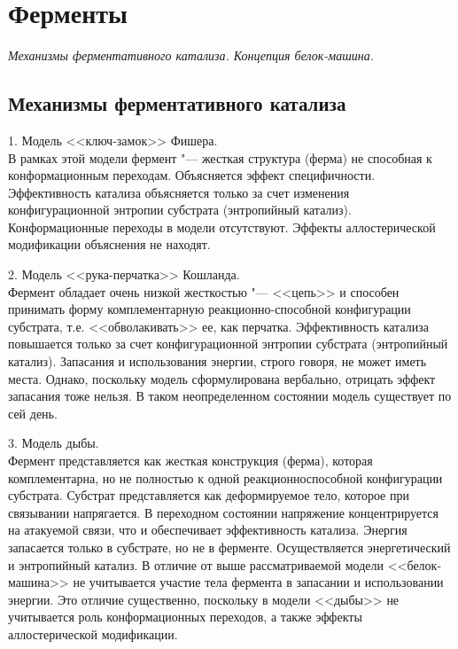 \documentclass[12pt,a4paper,oneside]{book}
\begin{document}
\newpage
\section{Ферменты}
{\it Механизмы ферментативного катализа. Концепция белок-машина. }

\subsection{Механизмы ферментативного катализа}

1. Модель <<ключ-замок>>  Фишера. \\
В рамках этой модели фермент "--- жесткая структура (ферма) не способная к конформационным переходам. Объясняется эффект специфичности. Эффективность катализа объясняется только за счет изменения конфигурационной энтропии субстрата (энтропийный катализ). Конформационные переходы в модели отсутствуют. Эффекты аллостерической модификации объяснения не находят. 

2. Модель <<рука-перчатка>> Кошланда. \\
Фермент обладает очень низкой жесткостью "--- <<цепь>> и способен принимать форму комплементарную реакционно-способной конфигурации субстрата, т.е. <<обволакивать>> ее, как перчатка. Эффективность катализа повышается только за счет конфигурационной энтропии субстрата (энтропийный катализ). Запасания и использования энергии, строго говоря, не может иметь места. Однако, поскольку модель сформулирована вербально, отрицать эффект запасания тоже нельзя. В таком неопределенном состоянии модель существует по сей день. 

3. Модель дыбы.\\
Фермент представляется как жесткая конструкция (ферма), которая комплементарна, но не полностью к одной реакционноспособной конфигурации субстрата. Субстрат представляется как деформируемое тело, которое при связывании напрягается. В переходном состоянии напряжение концентрируется на атакуемой связи, что и обеспечивает эффективность катализа. Энергия запасается только в субстрате, но не в ферменте. Осуществляется энергетический и энтропийный катализ. В отличие от выше рассматриваемой модели <<белок-машина>> не учитывается участие тела фермента в запасании и использовании энергии. Это отличие существенно, поскольку в модели <<дыбы>> не учитывается роль конформационных переходов, а также эффекты аллостерической модификации. 
\end{document}

